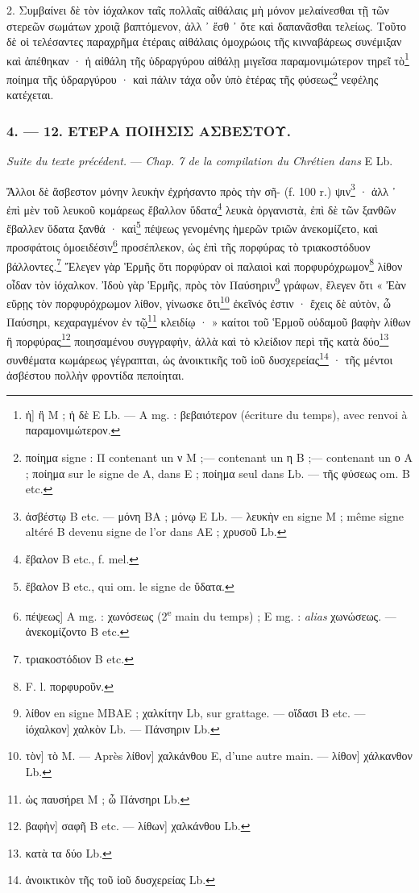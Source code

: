 \documentclass[a4paper, 11pt, oneside, polutonikogreek, french]{article}
\begin{document}
2. Συμβαίνει δὲ τὸν ἰόχαλκον ταῖς πολλαῖς αἰθάλαις μὴ μόνον μελαίνεσθαι τῇ τῶν στερεῶν σωμάτων χροιᾷ βαπτόμενον, ἀλλ ᾽ ἔσθ ᾽ ὅτε καὶ δαπανᾶσθαι τελείως. Τοῦτο δὲ οἱ τελέσαντες παραχρῆμα ἑτέραις αἰθάλαις ὁμοχρώοις τῆς κινναβάρεως συνέμιξαν καὶ ἀπέθηκαν · ἡ αἰθάλη τῆς ὑδραργύρου αἰθάλῃ μιγεῖσα παραμονιμώτερον τηρεῖ τὸ\footnote{ἡ] ἢ M ; ἡ δὲ E Lb. --- A mg. : βεβαιότερον (écriture du temps), avec renvoi à παραμονιμώτερον.} ποίημα τῆς ὑδραργύρου · καὶ πάλιν τάχα οὖν ὑπὸ ἑτέρας τῆς φύσεως\footnote{ποίημα signe : Π contenant un ν M ;--- contenant un η B ;--- contenant un ο A ; ποίημα sur le signe de A, dans E ; ποίημα seul dans Lb. --- τῆς φύσεως om. B etc.} νεφέλης κατέχεται.

\bigskip
\centerline{\EightStarTaper}
\centerline{\EightStarTaper\EightStarTaper}
\bigskip

\subsubsection{4. --- 12. ΕΤΕΡΑ ΠΟΙΗΣΙΣ ΑΣΒΕΣΤΟΥ.}

\emph{Suite du texte précédent.} --- \emph{Chap. 7 de la compilation du Chrétien dans} E Lb.

\bigskip

Ἄλλοι δὲ ἄσβεστον μόνην λευκὴν ἐχρήσαντο πρὸς τὴν σῆ- (f. 100 r.) ψιν\footnote{ἀσβέστῳ B etc. --- μόνη BA ; μόνῳ E Lb. --- λευκὴν en signe M ; même signe altéré B devenu signe de l'or dans AE ; χρυσοῦ Lb.} · ἀλλ ᾽ ἐπὶ μὲν τοῦ λευκοῦ κομάρεως ἔβαλλον ὕδατα\footnote{ἔβαλον B etc., f. mel.} λευκὰ ὀργανιστὰ, ἐπὶ δὲ τῶν ξανθῶν ἔβαλλεν ὕδατα ξανθά · καὶ\footnote{ἔβαλον B etc., qui om. le signe de ὕδατα.} πέψεως γενομένης ἡμερῶν τριῶν ἀνεκομίζετο, καὶ προσφάτοις ὁμοειδέσιν\footnote{πέψεως] A mg. : χωνόσεως (2\textsuperscript{e} main du temps) ; E mg. : \emph{alias} χωνώσεως. --- ἀνεκομίζοντο B etc.} προσέπλεκον, ὡς ἐπὶ τῆς πορφύρας τὸ τριακοστόδυον βάλλοντες.\footnote{τριακοστόδιον B etc.} Ἔλεγεν γὰρ Ἑρμῆς ὅτι πορφύραν οἱ παλαιοὶ καὶ πορφυρόχρωμον\footnote{F. l. πορφυροῦν.} λίθον οἶδαν τὸν ἰόχαλκον. Ἰδοὺ γὰρ Ἑρμῆς, πρὸς τὸν Παύσηριν\footnote{λίθον en signe MBAE ; χαλκίτην Lb, sur grattage. --- οἴδασι B etc. --- ἰόχαλκον] χαλκὸν Lb. --- Πάνσηριν Lb.} γράφων, ἔλεγεν ὅτι « Ἐὰν εὕρῃς τὸν πορφυρόχρωμον λίθον, γίνωσκε ὅτι\footnote{τὸν] τὸ M. --- Après λίθον] χαλκάνθου E, d'une autre main. --- λίθον] χάλκανθον Lb.} ἐκεῖνός ἐστιν · ἔχεις δὲ αὐτὸν, ὦ Παύσηρι, κεχαραγμένον ἐν τῷ\footnote{ὡς παυσήρει M ; ὦ Πάνσηρι Lb.} κλειδίῳ · » καίτοι τοῦ Ἑρμοῦ οὐδαμοῦ βαφὴν λίθων ἢ πορφύρας\footnote{βαφὴν] σαφῆ B etc. --- λίθων] χαλκάνθου Lb.} ποιησαμένου συγγραφὴν, ἀλλὰ καὶ τὸ κλείδιον περὶ τῆς κατὰ δύο\footnote{κατὰ τα δύο Lb.} συνθέματα κωμάρεως γέγραπται, ὡς ἀνοικτικῆς τοῦ ἰοῦ δυσχερείας\footnote{ἀνοικτικὸν τῆς τοῦ ἰοῦ δυσχερείας Lb.} · τῆς μέντοι ἀσβέστου πολλὴν φροντίδα πεποίηται.
\end{document}
